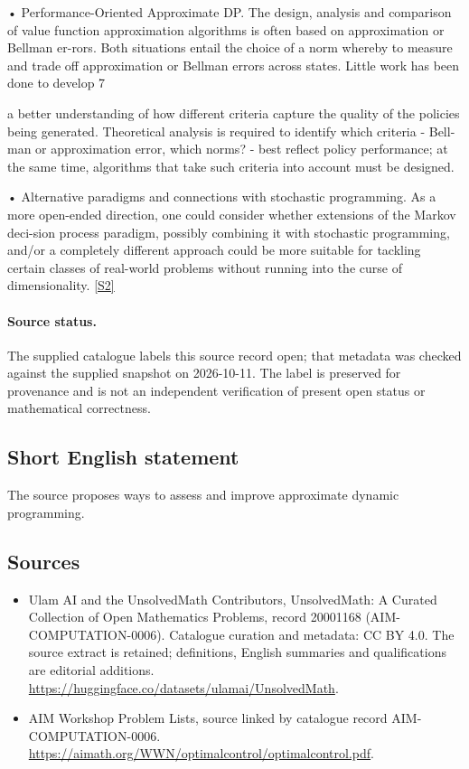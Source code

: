 \documentclass[11pt]{article}
\begin{document}
• Performance-Oriented Approximate DP. The design, analysis and comparison of value function approximation algorithms is often based on approximation or Bellman er-rors. Both situations entail the choice of a norm whereby to measure and trade off approximation or Bellman errors across states. Little work has been done to develop 7

a better understanding of how different criteria capture the quality of the policies being generated. Theoretical analysis is required to identify which criteria - Bell-man or approximation error, which norms? - best reflect policy performance; at the same time, algorithms that take such criteria into account must be designed.

• Alternative paradigms and connections with stochastic programming. As a more open-ended direction, one could consider whether extensions of the Markov deci-sion process paradigm, possibly combining it with stochastic programming, and/or a completely different approach could be more suitable for tackling certain classes of real-world problems without running into the curse of dimensionality. \href{https://aimath.org/WWN/optimalcontrol/optimalcontrol.pdf}{[S2]}
\paragraph{Source status.}
The supplied catalogue labels this source record open; that metadata was checked against the supplied snapshot on 2026-10-11. The label is preserved for provenance and is not an independent verification of present open status or mathematical correctness.
\subsection{Short English statement}
The source proposes ways to assess and improve approximate dynamic programming.
\subsection{Sources}
\begin{itemize}
\item[S1] Ulam AI and the UnsolvedMath Contributors, UnsolvedMath: A Curated Collection of Open Mathematics Problems, record 20001168 (AIM-COMPUTATION-0006). Catalogue curation and metadata: CC BY 4.0. The source extract is retained; definitions, English summaries and qualifications are editorial additions.
\url{https://huggingface.co/datasets/ulamai/UnsolvedMath}.
\item[S2] AIM Workshop Problem Lists, source linked by catalogue record AIM-COMPUTATION-0006.
\url{https://aimath.org/WWN/optimalcontrol/optimalcontrol.pdf}.
\end{itemize}
\end{document}
